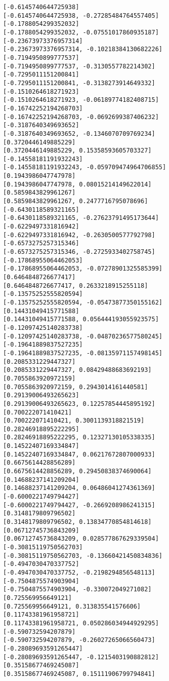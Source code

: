 \documentclass[11pt]{article}
\begin{document}
\begin{Verbatim}[commandchars=\\\{\}]
[-0.6145740644725938]
[-0.6145740644725938, -0.27285484764557405]
[-0.1788054299352032]
[-0.1788054299352032, -0.07551017860935187]
[-0.23673973376957314]
[-0.23673973376957314, -0.10218384130682226]
[-0.7194950899777537]
[-0.7194950899777537, -0.3130557782214302]
[-0.7295011151200841]
[-0.7295011151200841, -0.3138273914649332]
[-0.1510264618271923]
[-0.1510264618271923, -0.06189774182408715]
[-0.16742252194268703]
[-0.16742252194268703, -0.0692699387406232]
[-0.3187640349693652]
[-0.3187640349693652, -0.1346070709769234]
[0.3720446149885229]
[0.3720446149885229, 0.15358593605703327]
[-0.14558181191932243]
[-0.14558181191932243, -0.059709474964706855]
[0.1943986047747978]
[0.1943986047747978, 0.08015214149622014]
[0.5859843829961267]
[0.5859843829961267, 0.2477716795078696]
[-0.6430118589321165]
[-0.6430118589321165, -0.27623791495173644]
[-0.6229497331816942]
[-0.6229497331816942, -0.2630500577792798]
[-0.6573275257315346]
[-0.6573275257315346, -0.2725933402758745]
[-0.17868955064462053]
[-0.17868955064462053, -0.07278901325585399]
[0.6464848726677417]
[0.6464848726677417, 0.2633218915255118]
[-0.13575252555820594]
[-0.13575252555820594, -0.05473877350155162]
[0.14431049415771588]
[0.14431049415771588, 0.056444193055923575]
[-0.12097425140283738]
[-0.12097425140283738, -0.04870236577580245]
[-0.19641889837527235]
[-0.19641889837527235, -0.08135971157498145]
[0.2085331229447327]
[0.2085331229447327, 0.08429488683692193]
[0.7055863920972159]
[0.7055863920972159, 0.2943014161440581]
[0.29139006493265623]
[0.29139006493265623, 0.12257854445895192]
[0.700222071410421]
[0.700222071410421, 0.3001139318821519]
[0.28246918895222295]
[0.28246918895222295, 0.12327130105338335]
[0.14522407169334847]
[0.14522407169334847, 0.06217672807000933]
[0.6675614428856289]
[0.6675614428856289, 0.29450838374690064]
[0.14688237141209204]
[0.14688237141209204, 0.06486041274361369]
[-0.6000221749794427]
[-0.6000221749794427, -0.2669208986241315]
[0.3148179809796502]
[0.3148179809796502, 0.13834770854814618]
[0.06712745736843209]
[0.06712745736843209, 0.028577867629339504]
[-0.30815119750562703]
[-0.30815119750562703, -0.13660421450834836]
[-0.4947030470337752]
[-0.4947030470337752, -0.2198294856548113]
[-0.7504875574903904]
[-0.7504875574903904, -0.330072049271082]
[0.725569956649121]
[0.725569956649121, 0.313835541576606]
[0.11743381961958721]
[0.11743381961958721, 0.050286034944929295]
[-0.590732594207879]
[-0.590732594207879, -0.26027265066560473]
[-0.28089693591265447]
[-0.28089693591265447, -0.1215403190882812]
[0.35158677469245087]
[0.35158677469245087, 0.15111906799794841]

\end{Verbatim}
\end{document}
